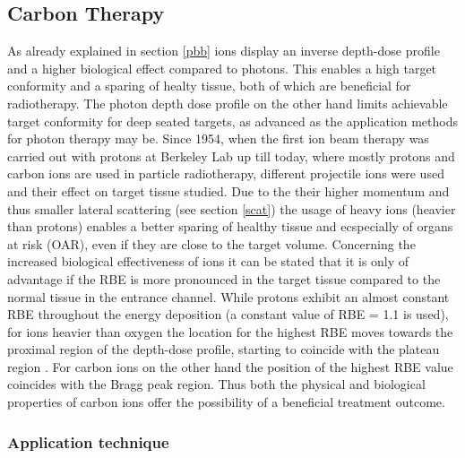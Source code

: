 \documentclass[type=dr, dr=rernat, accentcolor=tud7b,colorbacktitle, bigchapter, openright, twoside, 12pt ]{tudthesis}
\begin{document}
\subsection{Carbon Therapy}

As already explained in section \ref{pbb} ions display an inverse depth-dose profile and a higher biological effect compared to photons. 
This enables a high target conformity and a sparing of healty tissue, both of which are beneficial for radiotherapy. 
The photon depth dose profile on the other hand limits achievable target conformity for deep seated targets, as advanced as the application 
methods for photon therapy may be. Since 1954, when the first ion beam therapy was carried out with protons at Berkeley Lab 
\cite{Tob58} up till today, where mostly protons and carbon ions are used in particle radiotherapy, different projectile ions were used and 
their effect on target tissue studied.\newline
\newline
Due to the their higher momentum and thus smaller lateral scattering (see section \ref{scat}) the usage of heavy ions (heavier than protons) 
enables a better sparing of healthy tissue and ecspecially of organs at risk (OAR), even if they are close to the target volume. 
Concerning the increased biological effectiveness of ions it can be stated that it is only of advantage if the RBE is more pronounced 
in the target tissue compared to the normal tissue in the entrance channel. While protons exhibit an almost constant RBE throughout the 
energy deposition (a constant value of RBE = 1.1 is used), for ions heavier than oxygen the location for the highest RBE moves towards the 
proximal region of the depth-dose profile, starting to coincide with the plateau region \cite{Kra00}. For carbon ions on the other hand 
the position of the highest RBE value coincides with the Bragg peak region. Thus both the physical and biological properties of carbon ions 
offer the possibility of a beneficial treatment outcome. 

\subsubsection*{Application technique}
\end{document}
